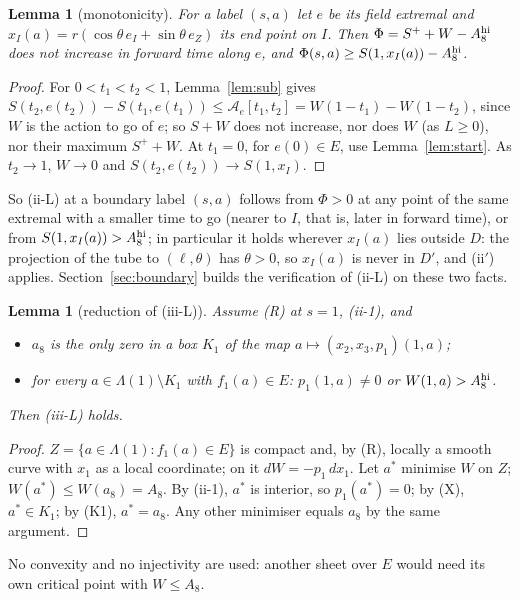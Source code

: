 \documentclass[11pt]{article}
\newtheorem{lemma}[theorem]{Lemma}
\theoremstyle{definition}
\begin{document}
\begin{lemma}[monotonicity]\label{lem:mono}
For a label $(s,a)$ let $e$ be its field extremal and $x_I(a)=r(\cos\theta\,e_I+\sin\theta\,e_Z)$ its end point on $I$.
Then $\Phi=S^++W-A_8^{\rm hi}$ does not increase in forward time along $e$, and
$\Phi(s,a)\ge S(1,x_I(a))-A_8^{\rm hi}$.
\end{lemma}
\begin{proof}
For $0<t_1<t_2<1$, Lemma~\ref{lem:sub} gives $S(t_2,e(t_2))-S(t_1,e(t_1))\le\mathcal A_e[t_1,t_2]=W(1-t_1)-W(1-t_2)$,
since $W$ is the action to go of $e$; so $S+W$ does not increase, nor does $W$ (as $L\ge0$), nor their maximum
$S^++W$. At $t_1=0$, for $e(0)\in E$, use Lemma~\ref{lem:start}. As $t_2\to1$, $W\to0$ and
$S(t_2,e(t_2))\to S(1,x_I)$.
\end{proof}
So (ii-L) at a boundary label $(s,a)$ follows from $\Phi>0$ at any point of the same extremal with a smaller time to go
(nearer to $I$, that is, later in forward time), or from
$S(1,x_I(a))>A_8^{\rm hi}$; in particular it holds wherever $x_I(a)$ lies outside $D$: the projection of the tube to
$(\ell,\theta)$ has $\theta>0$, so $x_I(a)$ is never in $D'$, and (ii$'$) applies. Section~\ref{sec:boundary} builds the
verification of (ii-L) on these two facts.

\begin{lemma}[reduction of (iii-L)]\label{lem:iiiL}
Assume (R) at $s=1$, (ii-1), and
\begin{itemize}
\item[(K1)] $a_8$ is the only zero in a box $K_1$ of the map $a\mapsto(x_2,x_3,p_1)(1,a)$;
\item[(X)] for every $a\in\Lambda(1)\setminus K_1$ with $f_1(a)\in E$: $p_1(1,a)\neq0$ or $W(1,a)>A_8^{\rm hi}$.
\end{itemize}
Then (iii-L) holds.
\end{lemma}
\begin{proof}
$Z=\{a\in\Lambda(1):f_1(a)\in E\}$ is compact and, by (R), locally a smooth curve with $x_1$ as a local coordinate; on
it $dW=-p_1\,dx_1$. Let $a^*$ minimise $W$ on $Z$; $W(a^*)\le W(a_8)=A_8$. By (ii-1), $a^*$ is interior, so
$p_1(a^*)=0$; by (X), $a^*\in K_1$; by (K1), $a^*=a_8$. Any other minimiser equals $a_8$ by the same argument.
\end{proof}
No convexity and no injectivity are used: another sheet over $E$ would need its own critical point with $W\le A_8$.
\end{document}
